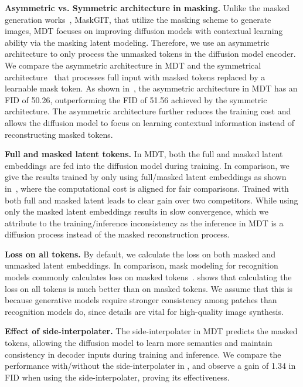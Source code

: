 \documentclass[final]{cvpr}
\newcommand{\myPara}[1]{\vspace{.08in} \noindent\textbf{#1}}
\begin{document}
\myPara{Asymmetric vs. Symmetric architecture in masking.}
Unlike the masked generation works~\cite{chang2022maskgit,chang2023muse},
\eg MaskGIT,
that utilize the masking scheme to generate images,
MDT focuses on improving diffusion models with contextual learning ability  via
the masking latent modeling.
Therefore, we use an asymmetric architecture to only process the unmasked tokens
in the diffusion model encoder.
We compare the asymmetric architecture in MDT and the symmetrical architecture~\cite{chang2022maskgit}
that processes full input with masked tokens replaced by a learnable mask token.
As shown in~,
the asymmetric architecture in MDT has an FID of 50.26, outperforming
 the FID of 51.56 
 achieved by the symmetric architecture.
The asymmetric architecture further reduces the training cost and allows  
the diffusion model to focus on learning contextual information instead of
reconstructing masked tokens.
 
\myPara{Full and masked latent tokens.}
In MDT, both the full and masked latent embeddings
are fed into the diffusion model during training.
In comparison, we give the results trained by only using full/masked latent embeddings
as shown in~,
where the computational cost is aligned for fair comparisons.
Trained with both full and masked latent leads to clear gain
over two competitors.
While using only the masked latent embeddings results in slow convergence,
which we attribute to the training/inference inconsistency
as the inference in MDT is a diffusion process instead of the masked reconstruction process.


\myPara{Loss on all tokens.}
By default, we calculate the loss on both masked and unmasked latent embeddings.
In comparison, mask modeling for recognition models commonly 
calculates loss on masked tokens~\cite{he2022masked,bao2021beit}.
 shows that
calculating the loss on all tokens is much better than on masked tokens.
We assume that this is because generative models require stronger consistency among patches than recognition models do,
since details are vital for high-quality image synthesis.

\myPara{Effect of side-interpolater.}
The side-interpolater in MDT predicts the masked tokens,
allowing the diffusion model to learn more semantics
and maintain consistency in decoder inputs during training and inference.
We compare the performance with/without the side-interpolater in
,
and observe a gain of
1.34 in FID when using the side-interpolater,
proving its effectiveness.
\end{document}
